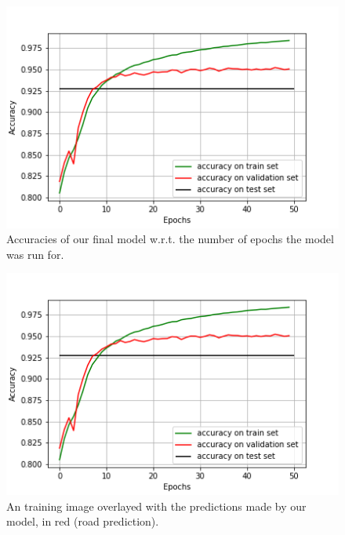 \documentclass[10pt,conference,compsocconf]{IEEEtran}
\begin{document}
\begin{figure}[h]
	\centering
	\includegraphics[width=\columnwidth]{U_Net_patches_256.png}
	\captionsetup{justification=centering, margin=0.1cm}
	\caption{Accuracies of our final model w.r.t. the number of epochs the model was run for.}
	\vspace{-6mm}
	\label{fig:final}
\end{figure}


\begin{figure}[h]
	\centering
	\includegraphics[width=\columnwidth]{U_Net_patches_256.png}
	\captionsetup{justification=centering, margin=0.1cm}
	\caption{An training image overlayed with the predictions made by our model, in red (road prediction).}
	\vspace{-6mm}
	\label{fig:comp}
\end{figure}
\end{document}
